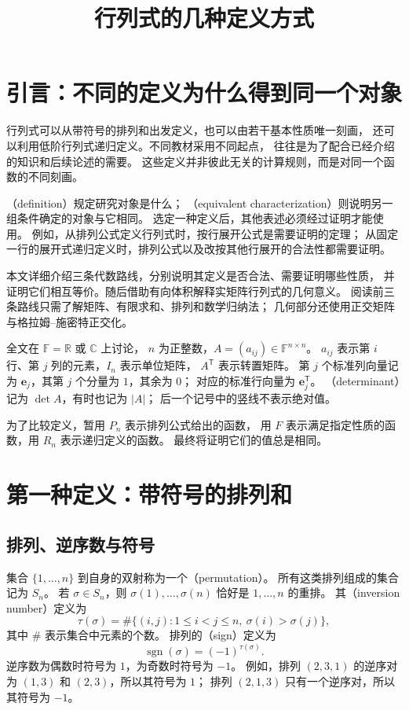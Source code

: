 \documentclass[UTF8,12pt,a4paper,fontset=fandol]{ctexart}
\title{行列式的几种定义方式}
\author{}
\date{}
\begin{document}
\maketitle
\tableofcontents

\section{引言：不同的定义为什么得到同一个对象}

行列式可以从带符号的排列和出发定义，也可以由若干基本性质唯一刻画，
还可以利用低阶行列式递归定义。不同教材采用不同起点，
往往是为了配合已经介绍的知识和后续论述的需要。
这些定义并非彼此无关的计算规则，而是对同一个函数的不同刻画。

（definition）规定研究对象是什么；
（equivalent characterization）则说明另一组条件确定的对象与它相同。
选定一种定义后，其他表述必须经过证明才能使用。
例如，从排列公式定义行列式时，按行展开公式是需要证明的定理；
从固定一行的展开式递归定义时，排列公式以及改按其他行展开的合法性都需要证明。

本文详细介绍三条代数路线，分别说明其定义是否合法、需要证明哪些性质，
并证明它们相互等价。随后借助有向体积解释实矩阵行列式的几何意义。
阅读前三条路线只需了解矩阵、有限求和、排列和数学归纳法；
几何部分还使用正交矩阵与格拉姆--施密特正交化。

全文在 $\mathbb F=\mathbb R$ 或 $\mathbb C$ 上讨论，
$n$ 为正整数，$A=(a_{ij})\in\mathbb F^{n\times n}$。
$a_{ij}$ 表示第 $i$ 行、第 $j$ 列的元素，$I_n$ 表示单位矩阵，
$A^{\mathsf T}$ 表示转置矩阵。
第 $j$ 个标准列向量记为 $\mathbf e_j$，其第 $j$ 个分量为 $1$，其余为 $0$；
对应的标准行向量为 $\mathbf e_j^{\mathsf T}$。
（determinant）记为 $\det A$，有时也记为 $|A|$；
后一个记号中的竖线不表示绝对值。

为了比较定义，暂用 $P_n$ 表示排列公式给出的函数，
用 $F$ 表示满足指定性质的函数，用 $R_n$ 表示递归定义的函数。
最终将证明它们的值总是相同。

\section{第一种定义：带符号的排列和}
\label{sec:permutation-definition}

\subsection{排列、逆序数与符号}

集合 $\{1,\ldots,n\}$ 到自身的双射称为一个（permutation）。
所有这类排列组成的集合记为 $S_n$。
若 $\sigma\in S_n$，则 $\sigma(1),\ldots,\sigma(n)$ 恰好是 $1,\ldots,n$ 的重排。
其（inversion number）定义为
\[
  \tau(\sigma)
  =\#\{(i,j):1\leq i<j\leq n,\ \sigma(i)>\sigma(j)\},
\]
其中 $\#$ 表示集合中元素的个数。
排列的（sign）定义为
\[
  \operatorname{sgn}(\sigma)=(-1)^{\tau(\sigma)}.
\]
逆序数为偶数时符号为 $1$，为奇数时符号为 $-1$。
例如，排列 $(2,3,1)$ 的逆序对为 $(1,3)$ 和 $(2,3)$，所以其符号为 $1$；
排列 $(2,1,3)$ 只有一个逆序对，所以其符号为 $-1$。
\end{document}
